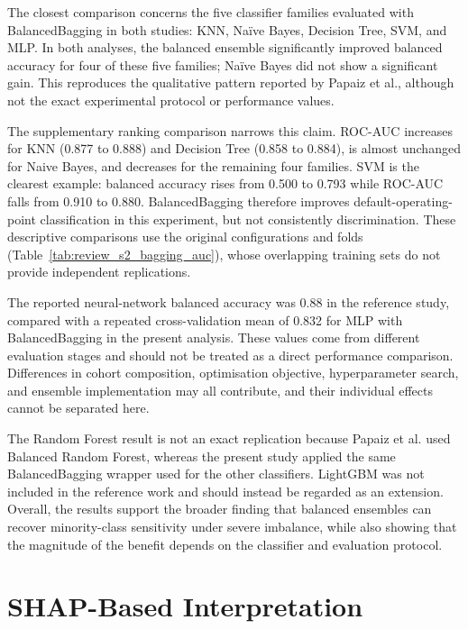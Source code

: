 The closest comparison concerns the five classifier families evaluated with BalancedBagging in both studies: KNN, Naïve Bayes, Decision Tree, SVM, and MLP. In both analyses, the balanced ensemble significantly improved balanced accuracy for four of these five families; Naïve Bayes did not show a significant gain. This reproduces the qualitative pattern reported by Papaiz et al., although not the exact experimental protocol or performance values.

The supplementary ranking comparison narrows this claim. ROC-AUC increases for KNN (0.877 to 0.888) and Decision Tree (0.858 to 0.884), is almost unchanged for Naive Bayes, and decreases for the remaining four families. SVM is the clearest example: balanced accuracy rises from 0.500 to 0.793 while ROC-AUC falls from 0.910 to 0.880. BalancedBagging therefore improves default-operating-point classification in this experiment, but not consistently discrimination. These descriptive comparisons use the original configurations and folds (Table~\ref{tab:review_s2_bagging_auc}), whose overlapping training sets do not provide independent replications.

The reported neural-network balanced accuracy was 0.88 in the reference study, compared with a repeated cross-validation mean of 0.832 for MLP with BalancedBagging in the present analysis. These values come from different evaluation stages and should not be treated as a direct performance comparison. Differences in cohort composition, optimisation objective, hyperparameter search, and ensemble implementation may all contribute, and their individual effects cannot be separated here.

The Random Forest result is not an exact replication because Papaiz et al. used Balanced Random Forest, whereas the present study applied the same BalancedBagging wrapper used for the other classifiers. LightGBM was not included in the reference work and should instead be regarded as an extension. Overall, the results support the broader finding that balanced ensembles can recover minority-class sensitivity under severe imbalance, while also showing that the magnitude of the benefit depends on the classifier and evaluation protocol.

\section{SHAP-Based Interpretation}
\label{sec:s2r_shap}

